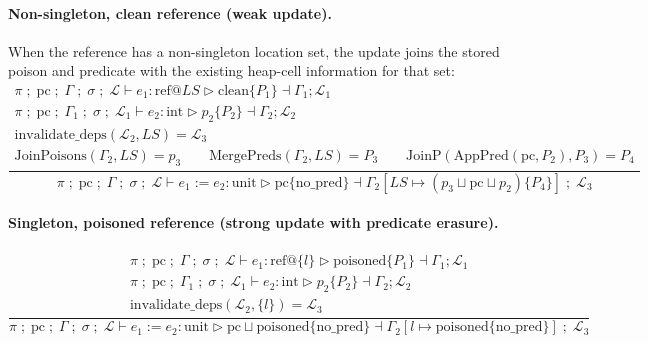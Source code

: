 \documentclass[12pt]{article}
\begin{document}
\paragraph{Non-singleton, clean reference (weak update).}
When the reference has a non-singleton location set, the update joins the stored poison and predicate
with the existing heap-cell information for that set:
\[
\frac{\begin{array}{c}
\pi \; ;\; \text{pc} \; ;\; \Gamma \; ;\; \sigma \; ;\; \mathcal{L} \vdash e_1 : \text{ref} @ LS \triangleright \text{clean} \{ P_1 \} \dashv \Gamma_1 ; \mathcal{L}_1 \\
\pi \; ;\; \text{pc} \; ;\; \Gamma_1 \; ;\; \sigma \; ;\; \mathcal{L}_1 \vdash e_2 : \text{int} \triangleright p_2 \{ P_2 \} \dashv \Gamma_2 ; \mathcal{L}_2 \\
\text{invalidate\_deps}(\mathcal{L}_2, LS) = \mathcal{L}_3 \\
\text{JoinPoisons}(\Gamma_2, LS) = p_3 \qquad \text{MergePreds}(\Gamma_2, LS) = P_3 \qquad \text{JoinP}(\mathrm{AppPred}(\text{pc}, P_2), P_3) = P_4
\end{array}}
{\pi \; ;\; \text{pc} \; ;\; \Gamma \; ;\; \sigma \; ;\; \mathcal{L} \vdash e_1 := e_2 : \text{unit} \triangleright \text{pc} \{ \text{no\_pred} \} \dashv \Gamma_2[LS \mapsto (p_3 \sqcup \text{pc} \sqcup p_2) \{ P_4 \}] \; ;\; \mathcal{L}_3}
\]

\paragraph{Singleton, poisoned reference (strong update with predicate erasure).}
\[
\frac{\begin{array}{c}
\pi \; ;\; \text{pc} \; ;\; \Gamma \; ;\; \sigma \; ;\; \mathcal{L} \vdash e_1 : \text{ref} @ \{l\} \triangleright \text{poisoned} \{ P_1 \} \dashv \Gamma_1 ; \mathcal{L}_1 \\
\pi \; ;\; \text{pc} \; ;\; \Gamma_1 \; ;\; \sigma \; ;\; \mathcal{L}_1 \vdash e_2 : \text{int} \triangleright p_2 \{ P_2 \} \dashv \Gamma_2 ; \mathcal{L}_2 \\
\text{invalidate\_deps}(\mathcal{L}_2, \{l\}) = \mathcal{L}_3
\end{array}}
{\pi \; ;\; \text{pc} \; ;\; \Gamma \; ;\; \sigma \; ;\; \mathcal{L} \vdash e_1 := e_2 : \text{unit} \triangleright \text{pc} \sqcup \text{poisoned} \{ \text{no\_pred} \} \dashv \Gamma_2[l \mapsto \text{poisoned} \{ \text{no\_pred} \}] \; ;\; \mathcal{L}_3}
\]
\end{document}
